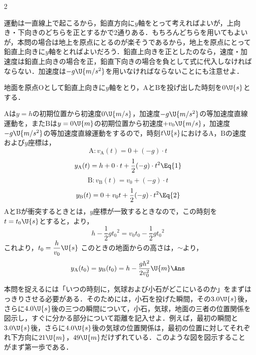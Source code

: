 \begin{multicols}{2}
\par\nopagebreak
\begin{sisin}
運動は一直線上で起こるから，鉛直方向に$y$軸をとって考えればよいが，上向き・下向きのどちらを正とするかで2通りある．もちろんどちらを用いてもよいが，本問の場合は地上を原点にとるのが楽そうであるから，地上を原点にとって鉛直上向きに$y$軸をとればよいだろう．鉛直上向きを正としたのなら，速度・加速度は鉛直上向きの場合を正，鉛直下向きの場合を負として式に代入しなければならない．加速度は$-g\U{m/s^2}$を用いなければならないことにも注意せよ．
\end{sisin}
\par\nopagebreak
\hspace{1zw}地面を原点$\mathrm{O}$として鉛直上向きに$y$軸をとり，$\mathrm{A}$と$\mathrm{B}$を投げ出した時刻を$0\U{s}$とする．
\begin{komon}
 $\mathrm{A}$は$y=h$の初期位置から初速度$0\U{m/s}$，加速度$-g\U{m/s^2}$の等加速度直線運動を，また$\mathrm{B}$は$y=0\U{m}$の初期位置から初速度$+v_0\U{m/s}$，加速度$-g\U{m/s^2}$の等加速度直線運動をするので，時刻$t\U{s}$における$\mathrm{A}$，$\mathrm{B}$の速度および$y$座標は，
       \[\mathrm{A}:v_{\mathrm{A}}(t)=0+(-g)\cdot t\]
       \[y_{\mathrm{A}}(t)=h+0\cdot t+\frac{1}{2}(-g)\cdot t^2\Eq{1}\]
       \[\mathrm{B}:v_{\mathrm{B}}(t)=v_0+(-g)\cdot t\]
       \[y_{\mathrm{B}}(t)=0+v_0t+\frac{1}{2}(-g)\cdot t^2\Eq{2}\]
       \hspace{1zw}$\mathrm{A}$と$\mathrm{B}$が衝突するときとは，$y$座標が一致するときなので，この時刻を$t=t_0\U{s}$とすると，より，
       \[h-\frac{1}{2}g{t_0}^2=v_0t_0-\frac{1}{2}g{t_0}^2\]
       これより，$t_0=\dfrac{h}{v_0}\U{s}$\Ans{}
 このときの地面からの高さは，$\sim$より，
       \[y_{\mathrm{A}}(t_0)=y_{\mathrm{B}}(t_0)=h-\frac{gh^2}{2v_0^2}\U{m}\Ans\]
\end{komon}

\par\nopagebreak
\begin{sisin}
本問を捉えるには「いつの時刻に，気球および小石がどこにいるのか」をまずはっきりさせる必要がある．そのためには，小石を投げた瞬間，その$3.0\U{s}$後，さらに$4.0\U{s}$後の三つの瞬間について，小石，気球，地面の三者の位置関係を図示し，すぐに分かる部分について距離を記入せよ．例えば，最初の瞬間と$3.0\U{s}$後，さらに$4.0\U{s}$後の気球の位置関係は，最初の位置に対してそれぞれ下方向に$21\U{m}$，$49\U{m}$だけずれている．このような図を図示することがまず第一歩である．


\end{sisin}
\end{multicols}
